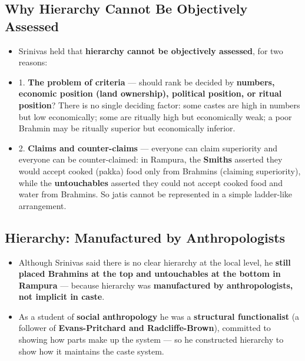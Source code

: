 \subsection{Why Hierarchy Cannot Be Objectively Assessed}

\begin{KeyConcept}
\begin{itemize}
\item Srinivas held that \textbf{hierarchy cannot be objectively assessed}, for two reasons:
\item 1. \textbf{The problem of criteria} --- should rank be decided by \textbf{numbers, economic position (land ownership), political position, or ritual position}? There is no single deciding factor: some castes are high in numbers but low economically; some are ritually high but economically weak; a poor Brahmin may be ritually superior but economically inferior.
\item 2. \textbf{Claims and counter-claims} --- everyone can claim superiority and everyone can be counter-claimed: in Rampura, the \textbf{Smiths} asserted they would accept cooked (pakka) food only from Brahmins (claiming superiority), while the \textbf{untouchables} asserted they could not accept cooked food and water from Brahmins. So jatis cannot be represented in a simple ladder-like arrangement.
\end{itemize}
\end{KeyConcept}

\subsection{Hierarchy: Manufactured by Anthropologists}

\begin{KeyConcept}
\begin{itemize}
\item Although Srinivas said there is no clear hierarchy at the local level, he \textbf{still placed Brahmins at the top and untouchables at the bottom in Rampura} --- because hierarchy was \textbf{manufactured by anthropologists, not implicit in caste}.
\item As a student of \textbf{social anthropology} he was a \textbf{structural functionalist} (a follower of \textbf{Evans-Pritchard and Radcliffe-Brown}), committed to showing how parts make up the system --- so he constructed hierarchy to show how it maintains the caste system.
\end{itemize}
\end{KeyConcept}

